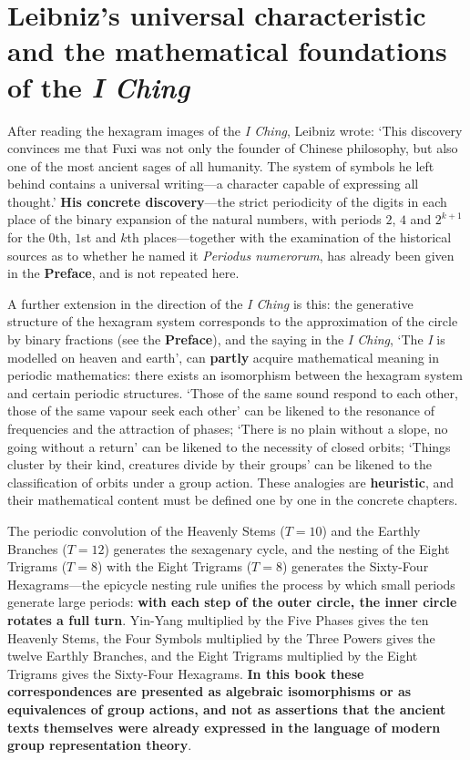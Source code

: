 \section*{Leibniz's universal characteristic and the mathematical foundations of the \emph{I Ching}}

After reading the hexagram images of the \emph{I Ching}, Leibniz wrote: `This discovery convinces me that Fuxi was not only the founder of Chinese philosophy, but also one of the most ancient sages of all humanity. The system of symbols he left behind contains a universal writing---a character capable of expressing all thought.' \textbf{His concrete discovery}---the strict periodicity of the digits in each place of the binary expansion of the natural numbers, with periods $2$, $4$ and $2^{k+1}$ for the $0$th, $1$st and $k$th places---together with the examination of the historical sources as to whether he named it \emph{Periodus numerorum}, has already been given in the \textbf{Preface}, and is not repeated here.

A further extension in the direction of the \emph{I Ching} is this: the generative structure of the hexagram system corresponds to the approximation of the circle by binary fractions (see the \textbf{Preface}), and the saying in the \emph{I Ching}, `The \emph{I} is modelled on heaven and earth', can \textbf{partly} acquire mathematical meaning in periodic mathematics: there exists an isomorphism between the hexagram system and certain periodic structures. `Those of the same sound respond to each other, those of the same vapour seek each other' can be likened to the resonance of frequencies and the attraction of phases; `There is no plain without a slope, no going without a return' can be likened to the necessity of closed orbits; `Things cluster by their kind, creatures divide by their groups' can be likened to the classification of orbits under a group action. These analogies are \textbf{heuristic}, and their mathematical content must be defined one by one in the concrete chapters.

The periodic convolution of the Heavenly Stems ($T=10$) and the Earthly Branches ($T=12$) generates the sexagenary cycle, and the nesting of the Eight Trigrams ($T=8$) with the Eight Trigrams ($T=8$) generates the Sixty-Four Hexagrams---the epicycle nesting rule unifies the process by which small periods generate large periods: \textbf{with each step of the outer circle, the inner circle rotates a full turn}. Yin-Yang multiplied by the Five Phases gives the ten Heavenly Stems, the Four Symbols multiplied by the Three Powers gives the twelve Earthly Branches, and the Eight Trigrams multiplied by the Eight Trigrams gives the Sixty-Four Hexagrams. \textbf{In this book these correspondences are presented as algebraic isomorphisms or as equivalences of group actions, and not as assertions that the ancient texts themselves were already expressed in the language of modern group representation theory}.

